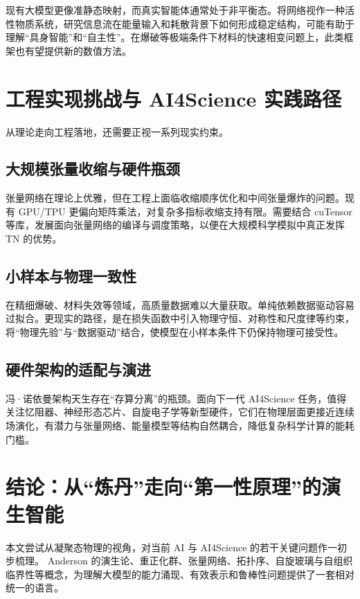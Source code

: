 \documentclass[12pt,a4paper]{article}
\begin{document}
现有大模型更像准静态映射，而真实智能体通常处于非平衡态。将网络视作一种活性物质系统\cite{vicsek2012collective}，研究信息流在能量输入和耗散背景下如何形成稳定结构，可能有助于理解“具身智能”和“自主性”。在爆破等极端条件下材料的快速相变问题上，此类框架也有望提供新的数值方法。

\section{工程实现挑战与 AI4Science 实践路径}

从理论走向工程落地，还需要正视一系列现实约束。

\subsection{大规模张量收缩与硬件瓶颈}

张量网络在理论上优雅，但在工程上面临收缩顺序优化和中间张量爆炸的问题。现有 GPU/TPU 更偏向矩阵乘法，对复杂多指标收缩支持有限。需要结合 cuTensor 等库，发展面向张量网络的编译与调度策略，以便在大规模科学模拟中真正发挥 TN 的优势。

\subsection{小样本与物理一致性}

在精细爆破、材料失效等领域，高质量数据难以大量获取。单纯依赖数据驱动容易过拟合。更现实的路径，是在损失函数中引入物理守恒、对称性和尺度律等约束，将“物理先验”与“数据驱动”结合，使模型在小样本条件下仍保持物理可接受性。

\subsection{硬件架构的适配与演进}

冯·诺依曼架构天生存在“存算分离”的瓶颈。面向下一代 AI4Science 任务，值得关注忆阻器、神经形态芯片、自旋电子学等新型硬件，它们在物理层面更接近连续场演化，有潜力与张量网络、能量模型等结构自然耦合，降低复杂科学计算的能耗门槛。

\section{结论：从“炼丹”走向“第一性原理”的演生智能}

本文尝试从凝聚态物理的视角，对当前 AI 与 AI4Science 的若干关键问题作一初步梳理。 Anderson 的演生论、重正化群、张量网络、拓扑序、自旋玻璃与自组织临界性等概念，为理解大模型的能力涌现、有效表示和鲁棒性问题提供了一套相对统一的语言。
\end{document}

